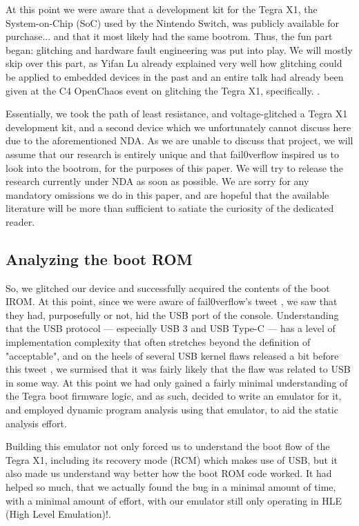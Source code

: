 \documentclass[journal]{IEEEtran}
\begin{document}
At this point we were aware that a development kit for the Tegra X1, the System-on-Chip (SoC) used
by the Nintendo Switch, was publicly available for purchase... and that it most likely had the same
bootrom. Thus, the fun part began: glitching and hardware fault engineering was put into play.
We will mostly skip over this part, as Yifan Lu already explained very well how glitching could be
applied to embedded devices in the past \cite{vita} \cite{vita_glitch} and an entire talk had
already been given at the C4 OpenChaos event on glitching the Tegra X1, specifically.
\cite{switch_glitch}.

Essentially, we took the path of least resistance, and voltage-glitched a Tegra X1 development kit,
and a second device which we unfortunately cannot discuss here due to the aforementioned NDA.
As we are unable to discuss that project, we will assume that our research is entirely unique
and that fail0verflow inspired us to look into the bootrom, for the purposes of this paper.
We will try to release the research currently under NDA as soon as possible. We are sorry for any
mandatory omissions we do in this paper, and are hopeful that the available literature will be more
than sufficient to satiate the curiosity of the dedicated reader.

\subsection{Analyzing the boot ROM}

So, we glitched our device and successfully acquired the contents of the boot IROM. At this point,
since we were aware of fail0verflow's tweet \cite{oh_come_on_it_was_getting_fun}, we saw that they
had, purposefully or not, hid the USB port of the console. Understanding that the USB protocol ---
especially USB 3 and USB Type-C --- has a level of implementation complexity that often stretches
beyond the definition of "acceptable", and on the heels of several USB kernel flaws released a bit
before this tweet \cite{usb_very_bad}, we surmised that it was fairly likely that the flaw was
related to USB in some way. At this point we had only gained a fairly minimal understanding of the
Tegra boot firmware logic, and as such, decided to write an emulator for it, and employed dynamic
program analysis using that emulator, to aid the static analysis effort.

Building this emulator not only forced us to understand the boot flow of the Tegra X1, including
its recovery mode (RCM) which makes use of USB, but it also made us understand way better how the
boot ROM code worked. It had helped so much, that we actually found the bug in a minimal amount of
time, with a minimal amount of effort, with our emulator still only operating in HLE
(High Level Emulation)!. 
\end{document}
